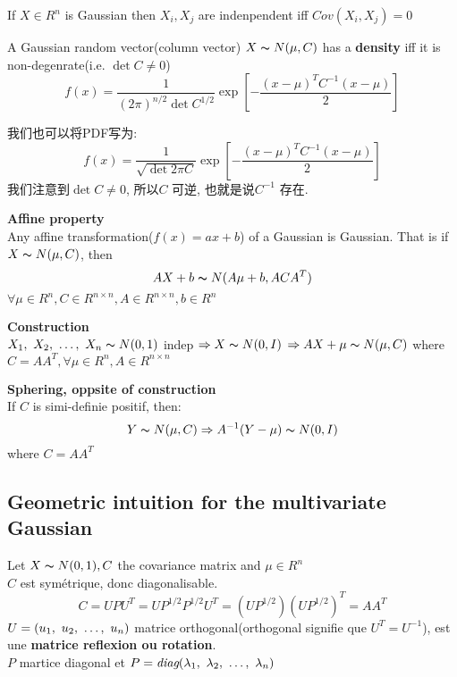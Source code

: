 \documentclass{article}
\begin{document}
\begin{theorem}
If $X \in R^n$ is Gaussian then $X_i, X_j$ are indenpendent iff $Cov(X_i, X_j) = 0$
\end{theorem}

\begin{theorem}
A Gaussian random vector(column vector) $X \thicksim{N}(\mu, C)$ has a \textbf{density} iff it is non-degenrate(i.e. $\det{C} \neq 0$)
$$
f(x) = \frac{1}{(2\pi)^{n/2} \det{C}^{1/2}} \exp[- \frac{(x - \mu)^T C^{-1} (x - \mu)}{2}]
$$
\end{theorem}
我们也可以将PDF写为:
$$
f(x) = \frac{1}{\sqrt{\det{2 \pi C}}} \exp[- \frac{(x - \mu)^T C^{-1} (x - \mu)}{2}]
$$
我们注意到$\det{C} \neq 0$, 所以$C$ 可逆, 也就是说$C^{-1}$ 存在.

\begin{theorem}
\textbf{Affine property}\\
Any affine transformation($f(x) = ax + b$) of a Gaussian is Gaussian. That is if $X \thicksim{N}(\mu, C)$, then
$$AX+b \thicksim{N}(A\mu + b, ACA^T)$$
$\forall \mu \in R^n, C \in R^{n \times n}, A \in R^{n \times n}, b \in R^n$
\end{theorem}

\begin{fact}
\textbf{Construction}\\
$X_1,~X_2,~\ldots,~X_n \thicksim{N}(0,1)$ indep $\Rightarrow X \thicksim{N}(0, I)$
$\Rightarrow AX + \mu \thicksim{N}(\mu, C)$ where $C = A A^T, \forall \mu \in R^n, A \in R^{n \times n}$
\end{fact}

\begin{fact}
\textbf{Sphering, oppsite of construction}\\
If $C$ is simi-definie positif, then:
$$Y \thicksim{N}(\mu, C) \Rightarrow A^{-1}(Y - \mu) \thicksim{N}(0,I)$$
where $C = A A^T$
\end{fact}

\subsection{Geometric intuition for the multivariate Gaussian}
Let $X \thicksim{N}(0,1), C $ the covariance matrix and $\mu \in R^n$\\
$C$ est sym\'etrique, donc diagonalisable.
$$
C = U P U^T = U P^{1/2} P^{1/2} U^T = (U P^{1/2}) (U P^{1/2})^T =  A A^T
$$
$U = (u_1,~u_2,~\ldots,~u_n)$ matrice orthogonal(orthogonal signifie que $U^T = U^{-1}$), est une \textbf{matrice reflexion ou rotation}.\\
$P$ martice diagonal et $P = \textit{diag}(\lambda_1,~\lambda_2,~\ldots,~\lambda_n)$
\end{document}
